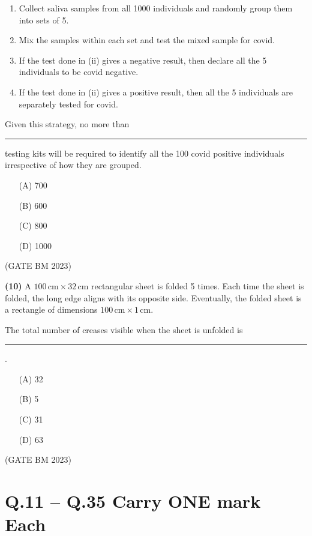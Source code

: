 \documentclass[journal]{IEEEtran}
\numberwithin{equation}{enumi}
\numberwithin{figure}{enumi}
\begin{document}
\begin{enumerate}[label=(\roman*)]
    \item Collect saliva samples from all 1000 individuals and randomly group them into sets of 5.
    \item Mix the samples within each set and test the mixed sample for covid.
    \item If the test done in (ii) gives a negative result, then declare all the 5 individuals to be covid negative.
    \item If the test done in (ii) gives a positive result, then all the 5 individuals are separately tested for covid.
\end{enumerate}

Given this strategy, no more than \rule{2cm}{0.15mm} testing kits will be required to identify all the 100 covid positive individuals irrespective of how they are grouped.

\medskip

\begin{enumerate}
    \item[(A)] 700
    \item[(B)] 600
    \item[(C)] 800
    \item[(D)] 1000
    \end{enumerate}
    \hfill (GATE BM 2023)
    
   \textbf {(10)}
A \(100 \, \text{cm} \times 32 \, \text{cm}\) rectangular sheet is folded 5 times. Each time the sheet is folded, the long edge aligns with its opposite side. Eventually, the folded sheet is a rectangle of dimensions \(100 \, \text{cm} \times 1 \, \text{cm}\).

\medskip

The total number of creases visible when the sheet is unfolded is \rule{2cm}{0.15mm}.

\medskip

\begin{enumerate}
    \item[(A)] 32
    \item[(B)] 5
    \item[(C)] 31
    \item[(D)] 63
\end{enumerate}
\hfill (GATE BM 2023)

\section*{Q.11 -- Q.35 Carry ONE mark Each}
\end{document}
